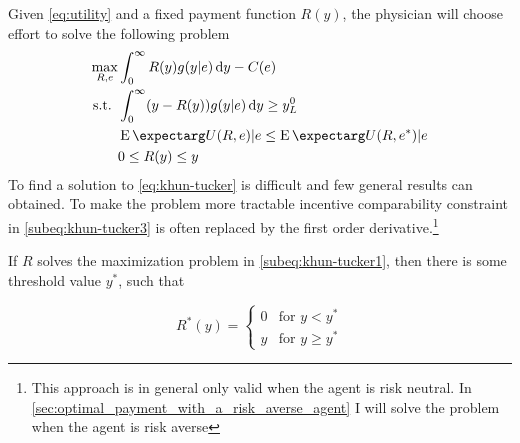 Given \cref{eq:utility} and a fixed payment function $R(y)$, the physician will choose effort to solve the following problem
\begin{subequations}
\label{eq:khun-tucker}
\begin{align}
    \max_{R,e} & \int_0^{\infty}R(y)g(y|e)\dif y-C(e)\label{subeq:khun-tucker1} \\
    \text{s.t. }    & \int_{0}^{\infty} (y-R(y))g(y|e)\dif y\geq y_L^0 \label{subeq:khun-tucker2} \\
                    & \cEX{U(R,e)|e}\leq \cEX{U(R,e^*)|e} \label{subeq:khun-tucker3}\\
                    & 0\leq R(y)\leq y \label{subeq:khun-tucker4}
\end{align}
\end{subequations}
To find a solution to \cref{eq:khun-tucker} is difficult and few general results can obtained. To make the problem more tractable incentive comparability constraint in \cref{subeq:khun-tucker3} is often replaced by the first order derivative.\footnote{This approach is in general only valid when the agent is risk neutral. In \cref{sec:optimal_payment_with_a_risk_averse_agent} I will solve the problem when the agent is risk averse}
\begin{proposition}
\label{prop:payment-function}
If $R$ solves the maximization problem in \cref{subeq:khun-tucker1}, then there is some threshold value $y^*$, such that 

\[
    R^*(y)=\begin{cases}
                0 & \text{for } y< y^* \\
                y & \text{for } y\geq y^*
            \end{cases}            
\]
\end{proposition}

